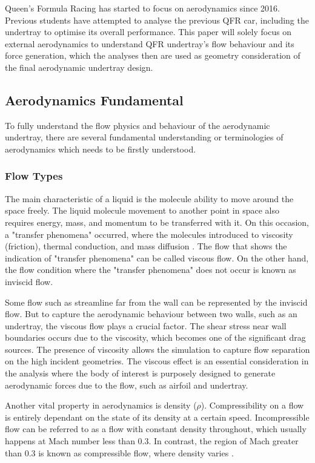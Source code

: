 \noindent Queen's Formula Racing has started to focus on aerodynamics since 2016. Previous students have attempted to analyse the previous QFR car, including the undertray to optimise its overall performance.  This paper will solely focus on external aerodynamics to understand QFR undertray's flow behaviour and its force generation, which the analyses then are used as geometry consideration of the final aerodynamic undertray design.

\subsection{Aerodynamics Fundamental}
To fully understand the flow physics and behaviour of the aerodynamic undertray, there are several fundamental understanding or terminologies of aerodynamics which needs to be firstly understood.

\subsubsection{Flow Types}
The main characteristic of a liquid is the molecule ability to move around the space freely. The liquid molecule movement to another point in space also requires energy, mass, and momentum to be transferred with it. On this occasion, a "transfer phenomena" occurred, where the molecules introduced to viscosity (friction), thermal conduction, and mass diffusion \cite{Anderson2010FundamentalsAerodynamics}. The flow that shows the indication of "transfer phenomena" can be called viscous flow. On the other hand, the flow condition where the "transfer phenomena" does not occur is known as inviscid flow.

\noindent Some flow such as streamline far from the wall can be represented by the inviscid flow. But to capture the aerodynamic behaviour between two walls, such as an undertray, the viscous flow plays a crucial factor. The shear stress near wall boundaries occurs due to the viscosity, which becomes one of the significant drag sources. The presence of viscosity allows the simulation to capture flow separation on the high incident geometries. The viscous effect is an essential consideration in the analysis where the body of interest is purposely designed to generate aerodynamic forces due to the flow, such as airfoil and undertray.

\noindent Another vital property in aerodynamics is density ($\rho$). Compressibility on a flow is entirely dependant on the state of its density at a certain speed. Incompressible flow can be referred to as a flow with constant density throughout, which usually happens at Mach number less than 0.3. In contrast, the region of Mach greater than 0.3 is known as compressible flow, where density varies \cite{Anderson2010FundamentalsAerodynamics}.

